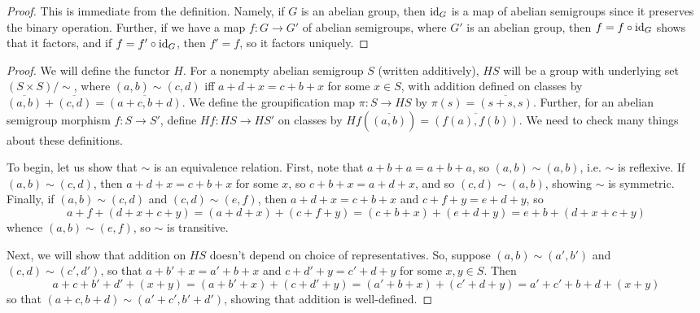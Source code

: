 \documentclass[12pt]{exam}
\begin{document}
\begin{proof}
	This is immediate from the definition. Namely, if $G$ is an abelian group, then $\operatorname{id}_G$ is a map of abelian semigroups since it preserves the binary operation. Further, if we have a map $f : G \to G'$ of abelian semigroups, where $G'$ is an abelian group, then $f = f \circ \operatorname{id}_G$ shows that it factors, and if $f = f' \circ \operatorname{id}_G$, then $f' = f$, so it factors uniquely.
\end{proof}

\begin{proof}
	We will define the functor $H$. For a nonempty abelian semigroup $S$ (written additively), $HS$ will be a group with underlying set $(S \times S)/\sim$, where $(a,b) \sim (c,d)$ iff $a+d+x = c+b+x$ for some $x \in S$, with addition defined on classes by $\overline{(a,b)}+\overline{(c,d)} = \overline{(a+c,b+d)}$. We define the groupification map $\pi : S \to HS$ by $\pi(s) = \overline{(s+s,s)}$. Further, for an abelian semigroup morphism $f : S \to S'$, define $Hf : HS \to HS'$ on classes by $Hf(\overline{(a,b)}) = \overline{(f(a),f(b))}$. We need to check many things about these definitions.
	
	To begin, let us show that $\sim$ is an equivalence relation. First, note that $a+b+a=a+b+a$, so $(a,b) \sim (a,b)$, i.e. $\sim$ is reflexive. If $(a,b) \sim (c,d)$, then $a+d+x = c+b+x$ for some $x$, so $c+b+x = a+d+x$, and so $(c,d) \sim (a,b)$, showing $\sim$ is symmetric. Finally, if $(a,b) \sim (c,d)$ and $(c,d) \sim (e,f)$, then $a+d+x = c+b+x$ and $c+f+y = e+d+y$, so
	\[ a+f+(d+x+c+y) = (a+d+x)+(c+f+y) = (c+b+x)+(e+d+y) = e+b+(d+x+c+y) \]
	whence $(a,b) \sim (e,f)$, so $\sim$ is transitive.
	
	Next, we will show that addition on $HS$ doesn't depend on choice of representatives. So, suppose $(a,b) \sim (a',b')$ and $(c,d) \sim (c',d')$, so that $a+b'+x = a'+b+x$ and $c+d'+y = c'+d+y$ for some $x,y \in S$. Then
	\[ a+c+b'+d'+(x+y) = (a+b'+x)+(c+d'+y) = (a'+b+x)+(c'+d+y) = a'+c'+b+d+(x+y) \]
	so that $(a+c,b+d) \sim (a'+c',b'+d')$, showing that addition is well-defined.
	

\end{proof}
\end{document}
